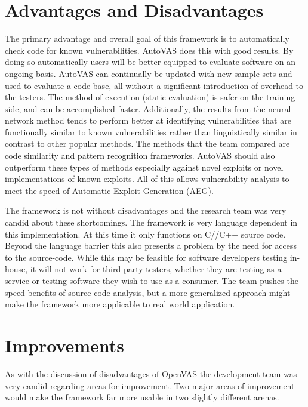 \documentclass[]{article}
\begin{document}


\section{Advantages and Disadvantages}

The primary advantage and overall goal of this framework is to automatically check code for known vulnerabilities. 
AutoVAS does this with good results.
By doing so automatically users will be better equipped to evaluate software on an ongoing basis.
AutoVAS can continually be updated with new sample sets and used to evaluate a code-base, all without a significant introduction of overhead to the testers.
The method of execution (static evaluation) is safer on the training side, and can be accomplished faster.
Additionally, the results from the neural network method tends to perform better at identifying vulnerabilities that are functionally similar to known vulnerabilities rather than linguistically similar in contrast to other popular methods.
The methods that the team compared are code similarity and pattern recognition frameworks. 
AutoVAS should also outperform these types of methods especially against novel exploits or novel implementations of known exploits.
All of this allows vulnerability analysis to meet the speed of Automatic Exploit Generation (AEG).

The framework is not without disadvantages and the research team was very candid about these shortcomings.
The framework is very language dependent in this implementation.
At this time it only functions on C//C++ source code.
Beyond the language barrier this also presents a problem by the need for access to the source-code.
While this may be feasible for software developers testing in-house, it will not work for third party testers, whether they are testing as a service or testing software they wish to use as a consumer.
The team pushes the speed benefits of source code analysis, but a more generalized approach might make the framework more applicable to real world application.

\section{Improvements}

As with the discussion of disadvantages of OpenVAS the development team was very candid regarding areas for improvement.
Two major areas of improvement would make the framework far more usable in two slightly different arenas.
\end{document}
